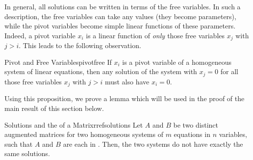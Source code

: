 In general, all solutions can be written in terms of the free variables. In such a description, the free variables can take any values (they become parameters), while the pivot variables become simple linear functions of these parameters. Indeed, a pivot variable $x_i$ is a linear function of {\em only \em}those free variables $x_j$ with $j>i$. This leads to the following observation.

\begin{proposition}{Pivot and Free Variables}{pivotfree}
If $x_i$ is a pivot variable of a homogeneous system of linear equations, then any solution of the system with $x_j=0$ for all those free variables $x_j$ with $j>i$ must also have $x_i=0$.
\end{proposition}

Using this proposition, we prove a lemma which will be used in the proof of the main result of this section below.

\begin{lemma}{Solutions and the {\RREF} of a Matrix}{rrefsolutions}
Let $A$ and $B$ be two distinct augmented matrices for two homogeneous systems of $m$ equations in $n$ variables, such that $A$ and $B$ are each in {\rref}. Then, the two systems do not have exactly the same solutions.
\end{lemma}

